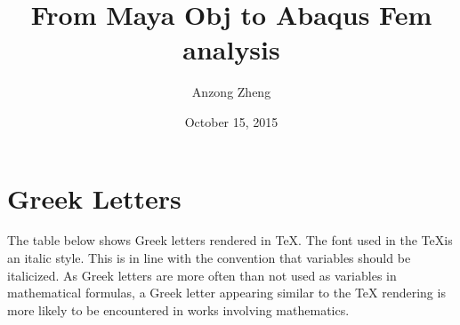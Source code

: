 \documentclass[10pt,a4paper]{article}
\begin{document}
\author{Anzong Zheng}
\title{From Maya Obj to Abaqus Fem analysis}
\date{October 15, 2015}
\maketitle
\newpage

\section{Greek Letters}
The table below shows Greek letters rendered in \TeX{}. The font used in the \TeX{}is an italic style. This is in line with the convention that variables should be italicized. As Greek letters are more often than not used as variables in mathematical formulas, a Greek letter appearing similar to the \TeX{} rendering is more likely to be encountered in works involving mathematics.
\end{document}
